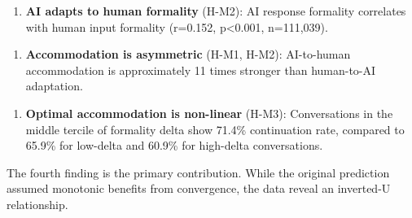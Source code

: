 \begin{enumerate}
\item \textbf{AI adapts to human formality} (H-M2): AI response formality correlates with human input formality (r=0.152, p<0.001, n=111,039).
\end{enumerate}

\begin{enumerate}
\item \textbf{Accommodation is asymmetric} (H-M1, H-M2): AI-to-human accommodation is approximately 11 times stronger than human-to-AI adaptation.
\end{enumerate}

\begin{enumerate}
\item \textbf{Optimal accommodation is non-linear} (H-M3): Conversations in the middle tercile of formality delta show 71.4\% continuation rate, compared to 65.9\% for low-delta and 60.9\% for high-delta conversations.
\end{enumerate}

The fourth finding is the primary contribution. While the original prediction assumed monotonic benefits from convergence, the data reveal an inverted-U relationship.

